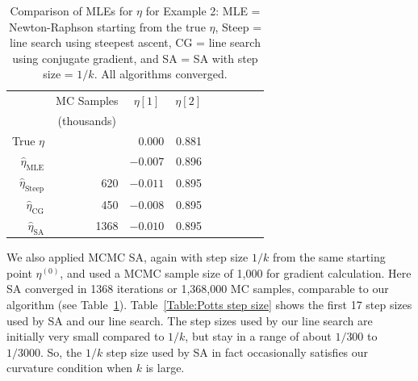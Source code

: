 \begin{table}[h!]
\caption[Comparison of MLEs for $\eta$ for Ising model example]{Comparison of MLEs for $\eta$ for Example 2: MLE = Newton-Raphson starting 
from the true $\eta$, Steep = 
line search using steepest ascent, CG = line search using conjugate gradient, and SA = 
SA with step size = $1/k$.  All 
algorithms converged.}
\begin{center}
\begin{tabular}{rrrrrrlrr}
  \hline
  \multicolumn{1}{c}{} & 
  \multicolumn{1}{c}{MC Samples} &
  \multicolumn{1}{c}{$\eta[1]$} &
  \multicolumn{1}{c}{$\eta[2]$} \\
    &  \multicolumn{1}{c}{(thousands)} &  &  & \\
  \hline
True $\eta$  & & 0.000 & 0.881 \\ 
  $\hat{\eta}_{\textrm{MLE}}$ & & $-0.007$ & 0.896 \\ 
  $\hat{\eta}_{\textrm{Steep}}$ & 620 & $-0.011$ & 0.895 \\ 
  $\hat{\eta}_{\textrm{CG}}$ & 450 & $-0.008$ & 0.895 \\ 
  $\hat{\eta}_{\textrm{SA}}$ & 1368 & $-0.010$ & 0.895 \\ 
   \hline
\end{tabular}
\end{center}
\label{Table:Potts}
\end{table}

We also applied MCMC SA, again with step size $1/k$ from the same starting point $\eta^
{(0)}$, and used
a MCMC sample size of 1,000 for gradient calculation.  
Here SA converged in 1368 iterations or 1,368,000 MC samples, comparable to our 
algorithm (see Table~\ref{Table:Potts}).  Table~\ref{Table:Potts step 
size} shows the first 17 step sizes used by SA and our line search.  The step sizes 
used by our line search are 
initially very small compared to $1/k$, but stay in a range of about $1/300$ to 
$1/3000$.  So, the $1/k$ step size used 
by SA in fact occasionally satisfies our curvature condition when $k$ is large. 

